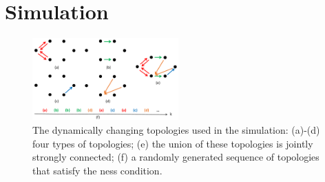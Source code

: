 \section{Simulation}\label{sec:sim}

	\begin{figure}		
		\includegraphics[width=0.5\textwidth]{figures/switch_topo}
		\caption{The dynamically changing topologies used in the simulation: (a)-(d) four types of topologies; (e) the union of these topologies is jointly strongly connected; (f) a randomly generated sequence of topologies that satisfy the \fc ness condition.}\label{fig:com_topo}		
	\end{figure}
	
